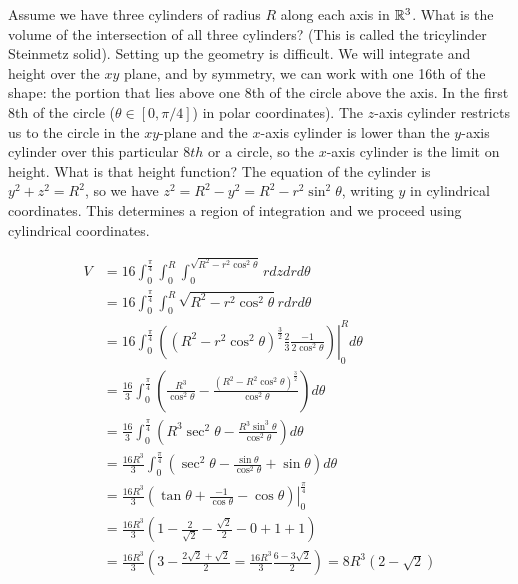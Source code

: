 \documentclass[fleqn,letterpaper]{report}
\begin{document}
\begin{example}
Assume we have three cylinders of radius $R$ along each axis
in $\mathbb{R}^3$. What is the volume of the intersection of all
three cylinders? (This is called the tricylinder Steinmetz
solid). Setting up the geometry is difficult. We will
integrate and height over the $xy$ plane, and by symmetry, we
can work with one 16th of the shape: the portion that lies
above one 8th of the circle above the axis. In the first 8th
of the circle ($\theta \in [0, \pi/4]$) in polar coordinates).
The $z$-axis cylinder restricts us to the circle in the
$xy$-plane and the $x$-axis cylinder is lower than the
$y$-axis cylinder over this particular $8th$ or a circle, so
the $x$-axis cylinder is the limit on height. What is that
height function? The equation of the cylinder is $y^2 + z^2 =
R^2$, so we have $z ^2 = R^2 - y^2 = R^2 - r^2 \sin^2\theta$,
writing $y$ in cylindrical coordinates. This determines a region of
integration and we proceed using cylindrical coordinates.

\begin{align*}
V & = 16 \int_0^{\frac{\pi}{4}} \int_0^R \int_0^{\sqrt{R^2-r^2
\cos^2\theta}} r dz dr d\theta \\
& = 16 \int_0^{\frac{\pi}{4}} \int_0^R \sqrt{R^2-r^2
\cos^2\theta} r dr d\theta \\
& = 16 \int_0^{\frac{\pi}{4}} \left. \left( (R^2-r^2
\cos^2\theta)^{\frac{3}{2}} \frac{2}{3}
\frac{-1}{2\cos^2\theta} \right) \right|_0^R d\theta \\
& = \frac{16}{3} \int_0^{\frac{\pi}{4}} \left(
\frac{R^3}{\cos^2 \theta} - \frac{(R^2-R^2\cos^2
\theta)^{\frac{3}{2}}}{\cos^2 \theta} \right) d \theta \\
& = \frac{16}{3} \int_0^{\frac{\pi}{4}} \left(
R^3\sec^2 \theta - \frac{R^3\sin^3 \theta}{\cos^2 \theta} \right) d
\theta \\
& = \frac{16R^3}{3} \int_0^{\frac{\pi}{4}} \left(
\sec^2 \theta - \frac{\sin \theta}{\cos^2 \theta} + \sin
\theta \right) d \theta \\
& = \frac{16R^3}{3} \left. \left( \tan \theta + \frac{-1}{\cos
\theta} - \cos \theta \right) \right|_0^{\frac{\pi}{4}} \\
& = \frac{16R^3}{3} \left( 1 - \frac{2}{\sqrt{2}} -
\frac{\sqrt{2}}{2} - 0 + 1 + 1 \right) \\
& = \frac{16R^3}{3} \left( 3 - \frac{2\sqrt{2} + \sqrt{2}}{2} =
\frac{16R^3}{3} \frac{6-3\sqrt{2}}{2} \right) = 8R^3 (2-\sqrt{2})
\end{align*}
\end{example}
\end{document}
